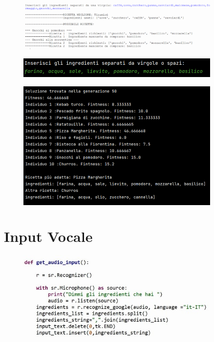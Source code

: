 \documentclass[12pt]{report}
\begin{document}
\begin{figure}[H]
        \centering
        {\includegraphics[width=0.9\textwidth]{img/img33.jpg}}
\end{figure}

\begin{figure}[H]
        \centering
        {\includegraphics[width=0.9\textwidth]{img/img35.jpg}}
\end{figure}

\begin{figure}[H]
        \centering
        {\includegraphics[width=0.9\textwidth]{img/img34.jpg}}
\end{figure}

\section{Input Vocale}   
\begin{figure}[H]
        \centering
        {\includegraphics[width=0.9\textwidth]{img/img20.jpg}}
\end{figure}
\end{document}
